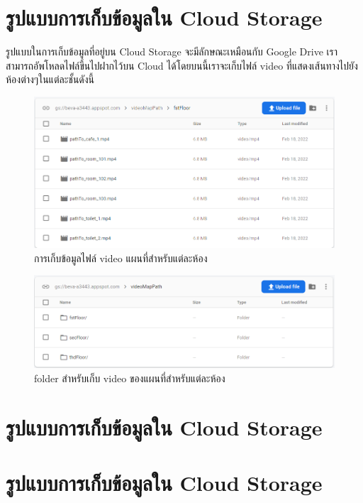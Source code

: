 \section{รูปแบบการเก็บข้อมูลใน Cloud Storage}
รูปแบบในการเก็บข้อมูลที่อยู่บน Cloud Storage จะมีลักษณะเหมือนกับ Google Drive เราสามารถอัพโหลดไฟล์ขึ้นไปฝากไว้บน Cloud
ได้โดยบนนี้เราจะเก็บไฟล์ video ที่แสดงเส้นทางไปยังห้องต่างๆในแต่ละชั้นดังนี้
\begin{figure}[hbt!]
  \begin{center}
  \includegraphics[width=\textwidth,keepaspectratio]{pic/db_storage.png}
  \end{center}
  \caption{การเก็บข้อมูลไฟล์ video แผนที่สำหรับแต่ละห้อง}
  \label{fig:db_storage}
\end{figure}

\begin{figure}[hbt!]
  \begin{center}
  \includegraphics[width=\textwidth,keepaspectratio]{pic/db_storage_floorFolder.png}
  \end{center}
  \caption{folder สำหรับเก็บ video ของแผนที่สำหรับแต่ละห้อง}
  \label{fig:db_storage_floorFolder}
\end{figure}
\section{รูปแบบการเก็บข้อมูลใน Cloud Storage}
\section{รูปแบบการเก็บข้อมูลใน Cloud Storage}